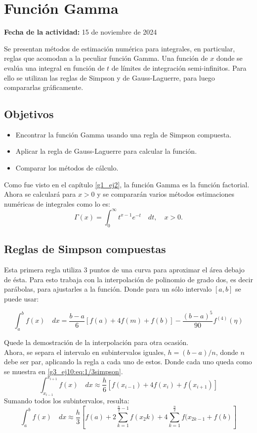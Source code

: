 \documentclass[../portafolio.tex]{subfiles}
\begin{document}
\chapter{Función Gamma}
\label{g3_ej10}
\hfill \textbf{Fecha de la actividad:} 15 de noviembre de 2024

\medskip

Se presentan métodos de estimación numérica para integrales, en particular, reglas que acomodan a la peculiar función Gamma. Una función de $x$ donde se evalúa una integral en función de $t$ de límites de integración semi-infinitos. Para ello se utilizan las reglas de Simpson y de Gauss-Laguerre, para luego compararlas gráficamente.

\section*{Objetivos}
\begin{itemize}
\item Encontrar la función Gamma usando una regla de Simpson compuesta.
\item Aplicar la regla de Gauss-Laguerre para calcular la función.
\item Comparar los métodos de cálculo.
\end{itemize}
Como fue visto en el capítulo \ref{g1_ej2}, la función Gamma es la función factorial. Ahora se calculará para $x>0$ y se compararán varios métodos estimaciones numéricas de integrales como lo es:
\begin{equation}\label{g3_ej10:eq:f_gamma}
\Gamma(x)=\int_{0}^{\infty}t^{x-1}e^{-t}\quad dt, \quad x>0.
\end{equation}
\section{Reglas de Simpson compuestas}
Esta primera regla utiliza 3 puntos de una curva para aproximar el área debajo de ésta. Para esto trabaja con la interpolación de polinomio de grado dos, es decir parábolas, para ajustarles a la función. Donde para un sólo intervalo $[a,b]$ se puede usar:

\begin{equation}\label{g3_ej10:eq:simpgeneral}
\int_{a}^{b} f(x)\quad dx =\frac{b-a}{6}[f(a)+4f(m)+f(b)]-\frac{(b-a)^5}{90}f^{(4)}(\eta)
\end{equation}

Quede la demostración de la interpolación para otra ocasión. \\
Ahora, se separa el intervalo en subintervalos iguales, $h=(b-a)/n$, donde $n$ debe ser par, aplicando la regla a cada uno de estos. Donde cada uno queda como se muestra en \eqref{g3_ej10:eq:1/3simpson}.
\begin{equation}\label{g3_ej10:eq:1/3simpson}
\int_{x_{i-1}}^{x_{i+1}} f(x)\quad dx \approx\frac{h}{6}[f(x_{i-1})+4f(x_i)+f(x_{i+1})]
\end{equation}
Sumando todos los subintervalos, resulta:
\begin{equation} \label{g3_ej10:eq:simpson}
\int_{a}^{b} f(x)\quad dx \approx \frac{h}{3} \left[ f(a)+2\sum_{k=1}^{\frac{n}{2}-1}f(x_2k)+4\sum_{k=1}^{\frac{n}{2}}f(x_{2k-1}+f(b)\right]
\end{equation}
\end{document}
